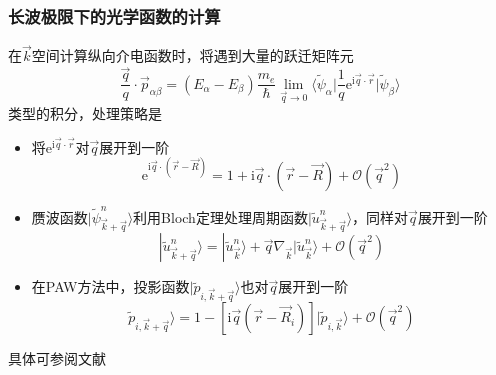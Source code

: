 \frame
{
	\frametitle{长波极限下的光学函数的计算}
	在$\vec k$空间计算纵向介电函数时，将遇到大量的跃迁矩阵元
	\begin{displaymath}
		\frac{\vec q}q\cdot\vec p_{\alpha\beta}=(E_{\alpha}-E_{\beta})\frac{m_e}{\hbar}\lim_{\vec q\rightarrow0}\bigg\langle\tilde\psi_{\alpha}\bigg|\frac1q\mathrm{e}^{\mathrm{i}\vec q\cdot\vec r}\bigg|\tilde\psi_{\beta}\bigg\rangle
	\end{displaymath}
	类型的积分，处理策略是
	\begin{itemize}
		\item 将$\mathrm{e}^{\mathrm{i}\vec q\cdot\vec r}$对$\vec q$展开到一阶
			\begin{displaymath}
				\mathrm{e}^{\mathrm{i}\vec q\cdot(\vec r-\vec R)}=1+\mathrm{i}\vec q\cdot(\vec r-\vec R)+\mathcal{O}(\vec q^2)
			\end{displaymath}
		\item 赝波函数$|\tilde\psi_{\vec k+\vec q}^n\rangle$利用\textrm{Bloch}定理处理周期函数$|\tilde{u}_{\vec k+\vec q}^n\rangle$，同样对$\vec q$展开到一阶
			\begin{displaymath}
				|\tilde u_{\vec k+\vec q}^n\rangle=|\tilde u_{\vec k}^n\rangle+\vec q\nabla_{\vec k}|\tilde u_{\vec k}^n\rangle+\mathcal{O}(\vec q^2)
			\end{displaymath}
		\item 在\textrm{PAW}方法中，投影函数$|\tilde p_{i,\vec k+\vec q}\rangle$也对$\vec q$展开到一阶
			\begin{displaymath}
				\tilde p_{i,\vec k+\vec q}\rangle=1-[\mathrm{i}\vec q(\vec r-\vec R_i)]|\tilde p_{i,\vec k}\rangle+\mathcal{O}(\vec q^2)
			\end{displaymath}
	\end{itemize}
	具体可参阅文献\cite{PRB73-045112_2006}
}

